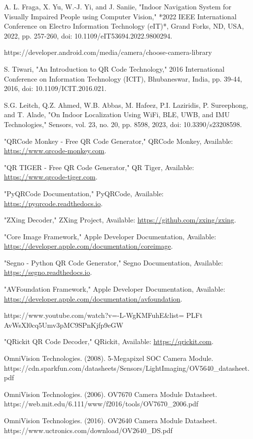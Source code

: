 \begin{thebibliography}{9}
	A. L. Fraga, X. Yu, W.-J. Yi, and J. Saniie, "Indoor Navigation System for Visually Impaired People using Computer Vision," *2022 IEEE International Conference on Electro Information Technology (eIT)*, Grand Forks, ND, USA, 2022, pp. 257-260, doi: 10.1109/eIT53694.2022.9800294.
	
	https://developer.android.com/media/camera/choose-camera-library
	
	S. Tiwari, "An Introduction to QR Code Technology," 2016 International Conference on Information Technology (ICIT), Bhubaneswar, India, pp. 39-44, 2016, doi: 10.1109/ICIT.2016.021.
	
	 S.G. Leitch, Q.Z. Ahmed, W.B. Abbas, M. Hafeez, P.I. Laziridis, P. Sureephong, and T. Alade, "On Indoor Localization Using WiFi, BLE, UWB, and IMU Technologies," Sensors, vol. 23, no. 20, pp. 8598, 2023, doi: 10.3390/s23208598.
	
	 "QRCode Monkey - Free QR Code Generator," QRCode Monkey, Available: \url{https://www.qrcode-monkey.com}.
	
	 "QR TIGER - Free QR Code Generator," QR Tiger, Available: \url{https://www.qrcode-tiger.com}.
	
	
	 "PyQRCode Documentation," PyQRCode, Available: \url{https://pyqrcode.readthedocs.io}.

	 "ZXing Decoder," ZXing Project, Available: \url{https://github.com/zxing/zxing}.

	 "Core Image Framework," Apple Developer Documentation, Available: \url{https://developer.apple.com/documentation/coreimage}.

	 "Segno - Python QR Code Generator," Segno Documentation, Available: \url{https://segno.readthedocs.io}.

	 "AVFoundation Framework," Apple Developer Documentation, Available: \url{https://developer.apple.com/documentation/avfoundation}.

	https://www.youtube.com/watch?v=-L-WgKMFuhE\&list=
	PLFt AvWsXl0cq5Umv3pMC9SPnKjfp9eGW

	 "QRickit QR Code Decoder," QRickit, Available: \url{https://qrickit.com}.
	
	OmniVision Technologies. (2008). 5-Megapixel SOC Camera Module. 
	https://cdn.sparkfun.com/datasheets/Sensors/LightImaging/OV5640\_datasheet.pdf
	
	OmniVision Technologies. (2006). OV7670 Camera Module Datasheet. 
	https://web.mit.edu/6.111/www/f2016/tools/OV7670\_2006.pdf
	
	OmniVision Technologies. (2016). OV2640 Camera Module Datasheet. 
	https://www.uctronics.com/download/OV2640\_DS.pdf
	
	
	
\end{thebibliography}